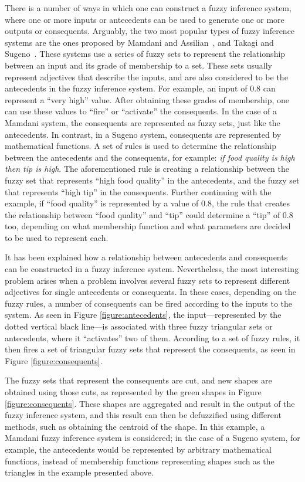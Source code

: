 \documentclass{ieeeaccess}
\begin{document}
There is a number of ways in which one can construct a fuzzy inference system,
where one or more inputs or antecedents can be used to generate one or more
outputs or consequents. Arguably, the two most popular types of fuzzy inference
systems are the ones proposed by Mamdani and Assilian~\cite{Mamdani1975}, and
Takagi and Sugeno~\cite{Takagi1985}. These systems use a series of fuzzy sets to
represent the relationship between an input and its grade of membership to a
set. These sets usually represent adjectives that describe the inputs, and are
also considered to be the antecedents in the fuzzy inference system. For
example, an input of 0.8 can represent a ``very high'' value. After obtaining
these grades of membership, one can use these values to ``fire'' or ``activate''
the consequents. In the case of a Mamdani system, the consequents are
represented as fuzzy sets, just like the antecedents. In contrast, in a Sugeno
system, consequents are represented by mathematical functions. A set of rules is
used to determine the relationship between the antecedents and the consequents,
for example: \textit{if food quality is high then tip is high}. The
aforementioned rule is creating a relationship between the fuzzy set that
represents ``high food quality'' in the antecedents, and the fuzzy set that
represents ``high tip'' in the consequents. Further continuing with the example,
if ``food quality'' is represented by a value of 0.8, the rule that creates the
relationship between ``food quality'' and ``tip'' could determine a ``tip'' of
0.8 too, depending on what membership function and what parameters are decided
to be used to represent each.

It has been explained how a relationship between antecedents and consequents can
be constructed in a fuzzy inference system. Nevertheless, the most interesting
problem arises when a problem involves several fuzzy sets to represent different
adjectives for single antecedents or consequents. In these cases, depending on
the fuzzy rules, a number of consequents can be fired according to the inputs to
the system. As seen in Figure \ref{figure:antecedents}, the input---represented
by the dotted vertical black line---is associated with three fuzzy
triangular sets or antecedents, where it ``activates'' two of them. According to
a set of fuzzy rules, it then fires a set of triangular fuzzy sets that
represent the consequents, as seen in Figure \ref{figure:consequents}.

The fuzzy sets that represent the consequents are cut, and new shapes are
obtained using those cuts, as represented by the green shapes in Figure
\ref{figure:consequents}. These shapes are aggregated and result in the output
of the fuzzy inference system, and this result can then be defuzzified using
different methods, such as obtaining the centroid of the shape. In this example,
a Mamdani fuzzy inference system is considered; in the case of a Sugeno system,
for example, the antecedents would be represented by arbitrary mathematical
functions, instead of membership functions representing shapes such as the
triangles in the example presented above.
\end{document}
